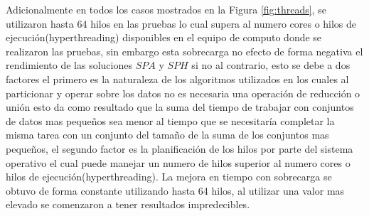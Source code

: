 Adicionalmente en todos los casos mostrados en la Figura \ref{fig:threads}, se utilizaron hasta 64 hilos en las pruebas lo cual supera al numero cores o hilos de ejecución(hyperthreading) disponibles en el equipo de computo donde se realizaron las pruebas, sin embargo esta sobrecarga no efecto de forma negativa el rendimiento de las soluciones $SPA$ y $SPH$ si no al contrario, esto se debe a dos factores el primero es la naturaleza de los algoritmos utilizados en los cuales al particionar y operar sobre los datos no es necesaria una operación de reducción o unión esto da como resultado que la suma del tiempo de trabajar con conjuntos de datos mas pequeños sea menor al tiempo que se necesitaría completar la misma tarea con un conjunto del tamaño de la suma de los conjuntos mas pequeños, el segundo factor es la planificación de los hilos por parte del sistema operativo el cual puede manejar un numero de hilos superior al numero cores o hilos de ejecución(hyperthreading). La mejora en tiempo con sobrecarga se obtuvo de forma constante utilizando hasta 64 hilos, al utilizar una valor mas elevado se comenzaron a tener resultados impredecibles.\\
\vfill
\pagebreak
\begingroup
\setlength{\parindent}{0cm}
